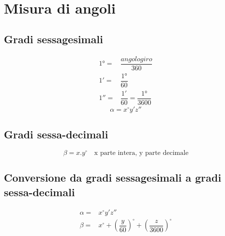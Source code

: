 \chapter{Misura di angoli}
\section{Gradi sessagesimali}
\begin{align*}
\ang{1}=&\dfrac{angolo giro}{360}\\
\ang{;1;}=&\dfrac{\ang{1}}{60}\\
\ang{;;1}=&\dfrac{\ang{;1;}}{60}=\dfrac{\ang{1}}{3600}
\end{align*}
\begin{equation*}
\alpha=x^\circ y'z''
\end{equation*}
\section{Gradi sessa-decimali}
\begin{equation*}
\beta=x.y^\circ\quad\text{x parte intera, y parte decimale}
\end{equation*}
\section{Conversione da gradi sessagesimali a gradi sessa-decimali}
\begin{align*}
\alpha=&x^\circ y'z''\\
\beta=&x^\circ+\left(\dfrac{y}{60}\right)^\circ+\left(\dfrac{z}{3600}\right)^\circ
\end{align*}

